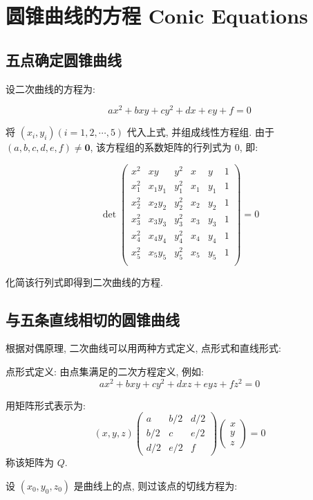 \chapter{圆锥曲线的方程 Conic Equations}

\section{五点确定圆锥曲线}

设二次曲线的方程为:

\[
  ax^2 + bxy + cy^2 + dx + ey + f = 0
\]

将 $(x_i,y_i) (i=1,2,\cdots,5)$ 代入上式, 并组成线性方程组.
由于 $(a, b, c, d, e, f) \neq \mathbf{0}$, 该方程组的系数矩阵的行列式为 0, 即:

\[
\det \begin{pmatrix}
x^2 & xy & y^2 & x & y & 1 \\
x^2_1 & x_1y_1 & y^2_1 & x_1 & y_1 & 1 \\
x^2_2 & x_2y_2 & y^2_2 & x_2 & y_2 & 1 \\
x^2_3 & x_3y_3 & y^2_3 & x_3 & y_3 & 1 \\
x^2_4 & x_4y_4 & y^2_4 & x_4 & y_4 & 1 \\
x^2_5 & x_5y_5 & y^2_5 & x_5 & y_5 & 1 \\
\end{pmatrix} = 0
\]

化简该行列式即得到二次曲线的方程.

\section{与五条直线相切的圆锥曲线}

根据对偶原理, 二次曲线可以用两种方式定义, 点形式和直线形式:

点形式定义: 由点集满足的二次方程定义, 例如:
  \[
  ax^2 + bxy + cy^2 + dxz + eyz + fz^2 = 0
  \]
  
用矩阵形式表示为:
  \[
  (x, y, z) \begin{pmatrix} a & b/2 & d/2 \\ b/2 & c & e/2 \\ d/2 & e/2 & f \end{pmatrix} \begin{pmatrix} x \\ y \\ z \end{pmatrix} = 0
  \]
称该矩阵为 \( Q \).

设 $(x_0,y_0,z_0)$ 是曲线上的点,  则过该点的切线方程为:

